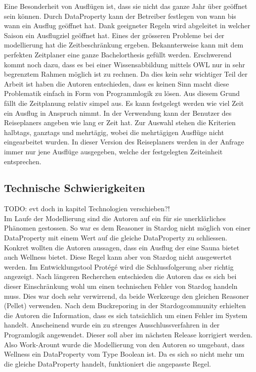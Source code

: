 Eine Besonderheit von Ausflügen ist, dass sie nicht das ganze Jahr über geöffnet sein können. Durch DataProperty kann der Betreiber festlegen von wann bis wann ein Ausflug geöffnet hat. Dank geeigneter Regeln wird abgeleitet in welcher Saison ein Ausflugziel geöffnet hat. Eines der grösseren Probleme bei der modellierung hat die Zeitbeschränkung ergeben. Bekannterweise kann mit dem perfekten Zeitplaner eine ganze Bachelorthesis gefüllt werden. 
Erschwerend kommt noch dazu, dass es bei einer Wissensabbildung mittels OWL nur in sehr begrenztem Rahmen möglich ist zu rechnen. Da dies kein sehr wichtiger Teil der Arbeit ist haben die Autoren entschieden, dass es keinen Sinn macht diese Problematik einfach in Form von Programmlogik zu lösen. Aus diesem Grund fällt die Zeitplanung relativ simpel aus. Es kann festgelegt werden wie viel Zeit ein Ausflug in Anspruch nimmt. In der Verwendung kann der Benutzer des Reiseplaners angeben wie lang er Zeit hat. Zur Auswahl stehen die Kriterien halbtags, ganztags und mehrtägig, wobei die mehrtägigen Ausflüge nicht eingearbeitet wurden. In dieser Version des Reiseplaners werden in der Anfrage immer nur jene Ausflüge ausgegeben, welche der festgelegten Zeiteinheit entsprechen.


 
\subsection{Technische Schwierigkeiten}
\label{subsec:loesung_modellierung_technischeSchwierigkeiten}
TODO: evt doch in kapitel Technologien verschieben?!\\
Im Laufe der Modellierung sind die Autoren auf ein für sie unerklärliches Phänomen gestossen. So war es dem Reasoner in Stardog nicht möglich von einer DataProperty mit einem Wert auf die gleiche DataProperty zu schliessen. Konkret wollten die Autoren aussagen, dass ein Ausflug der eine Sauna bietet auch Wellness bietet. Diese Regel kann aber von Stardog nicht ausgewertet werden. Im Entwicklungstool Protégé wird die Schlussfolgerung aber richtig angezeigt. Nach längeren Recherchen entschieden die Autoren das es sich bei dieser Einschränkung wohl um einen technischen Fehler von Stardog handeln muss. Dies war doch sehr verwirrend, da beide Werkzeuge den gleichen Reasoner (Pellet) verwenden. Nach dem Buckreporing in der Stardogcommunity erhielten die Autoren die Information, dass es sich tatsächlich um einen Fehler im System handelt. Anscheinend wurde ein zu strenges Ausschlussverfahren in der Programlogik angewendet. Dieser soll aber im nächsten Release korrigiert werden. \\
Also Work-Arount wurde die Modellierung von den Autoren so umgebaut, dass Wellness ein DataProperty vom Type Boolean ist. Da es sich so nicht mehr um die gleiche DataProperty handelt, funktioniert die angepasste Regel.

